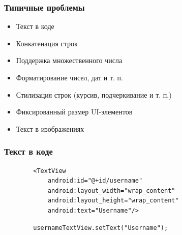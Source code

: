 \documentclass{beamer}
\begin{document}
\begin{frame}
    \frametitle{Типичные проблемы}
    \begin{itemize}
        \item Текст в коде
        \item Конкатенация строк
        \item Поддержка множественного числа
        \item Форматирование чисел, дат и т. п.
        \item Стилизация строк (курсив, подчеркивание и т. п.)
        \item Фиксированный размер UI-элементов
        \item Текст в изображениях
    \end{itemize}
\end{frame}

\begin{frame}[fragile]
    \frametitle{Текст в коде}
    \begin{verbatim}
        <TextView
            android:id="@+id/username"
            android:layout_width="wrap_content"
            android:layout_height="wrap_content"
            android:text="Username"/>
    \end{verbatim}
    \begin{verbatim}
        usernameTextView.setText("Username");
    \end{verbatim}
\end{frame}
\end{document}
